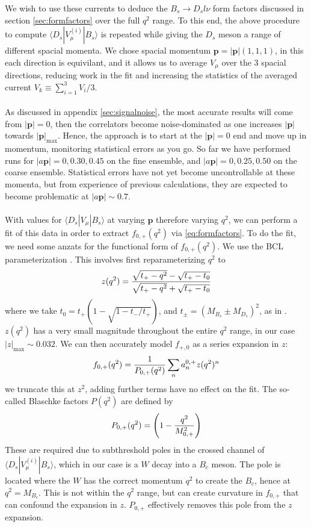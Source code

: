 We wish to use these currents to deduce the $B_s\to D_s l\nu$ form factors discussed in section \ref{sec:formfactors} over the full $q^2$ range. To this end, the above procedure to compute $\langle D_s | V^{(i)}_{\mu} | B_s \rangle$ is repeated while giving the $D_s$ meson a range of different spacial momenta. We chose spacial momentum ${\textbf{p}} = |{\textbf{p}}|(1,1,1)$, in this each direction is equivilant, and it allows us to average $V_{\mu}$ over the 3 spacial directions, reducing work in the fit and increasing the statistics of the averaged current $V_k \equiv \sum_{i=1}^3 V_i / 3$.
\\ \\
As discussed in appendix \ref{sec:signalnoise}, the most accurate results will come from $|{\textbf{p}}| = 0$, then the correlators become noise-dominated as one increases $|{\textbf{p}}|$ towards $|{\textbf{p}}|_{\text{max}}$. Hence, the approach is to start at the $|{\textbf{p}}|=0$ end and move up in momentum, monitoring statistical errors as you go. So far we have performed runs for $|a{\textbf{p}}| = 0,0.30,0.45$ on the fine ensemble, and $|a{\textbf{p}}|=0,0.25,0.50$ on the coarse ensemble. Statistical errors have not yet become uncontrollable at these momenta, but from experience of previous calculations, they are expected to become problematic at $|a{\textbf{p}}| \sim 0.7$. 
\\ \\
With values for $\langle D_s | V_{\mu} | B_s \rangle$ at varying ${\textbf{p}}$ therefore varying $q^2$, we can perform a fit of this data in order to extract $f_{0,+}(q^2)$ via \eqref{eq:formfactors}. To do the fit, we need some anzats for the functional form of $f_{0,+}(q^2)$. We use the BCL parameterization \cite{PhysRevD.79.013008}. This involves first reparameterizing $q^2$ to 
\begin{align}
	z(q^2) = {\sqrt{t_+ - q^2} - \sqrt{t_+ - t_0} \over \sqrt{t_+ - q^2} + \sqrt{t_+ - t_0} }
\end{align}
where we take $t_0 = t_+( 1 - \sqrt{1 - t_-/t_+})$, and $t_{\pm} = (M_{B_s} \pm M_{D_s})^2$, as in \cite{Hill:2006ub}. $z(q^2)$ has a very small magnitude throughout the entire $q^2$ range, in our case $|z|_{\text{max}} \sim 0.032$. We can then accurately model $f_{+,0}$ as a series expansion in $z$:
\begin{align}
	f_{0,+}(q^2) = {1\over P_{0,+}(q^2)} \sum_n a^{0,+}_n z(q^2)^n
	\label{eq:zexpansion}
\end{align}
we truncate this at $z^2$, adding further terms have no effect on the fit. The so-called Blaschke factors $P(q^2)$
are defined by
\begin{align}
	P_{0,+}(q^2) = \left( 1 - {q^2\over M_{0,+}^2}\right)
\end{align}
These are required due to subthreshold poles in the crossed channel of $\langle D_s | V^{(i)}_{\mu} | B_s \rangle$, which in our case is a $W$ decay into a $B_c$ meson. The pole is located where the $W$ has the correct momentum $q^2$ to create the $B_c$, hence at $q^2=M_{B_c}$. This is not within the $q^2$ range, but can create curvature in $f_{0,+}$ that can confound the expansion in $z$. $P_{0,+}$ effectively removes this pole from the $z$ expansion.

